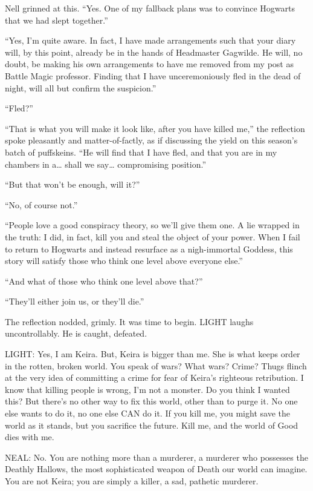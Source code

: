 Nell grinned at this. “Yes. One of my fallback plans was to convince Hogwarts that we had slept together.”

“Yes, I’m quite aware. In fact, I have made arrangements such that your diary will, by this point, already be in the hands of Headmaster Gagwilde. He will, no doubt, be making his own arrangements to have me removed from my post as Battle Magic professor. Finding that I have unceremoniously fled in the dead of night, will all but confirm the suspicion.”

“Fled?”

“That is what you will make it look like, after you have killed me,” the reflection spoke pleasantly and matter-of-factly, as if discussing the yield on this season’s batch of puffskeins. “He will find that I have fled, and that you are in my chambers in a… shall we say… compromising position.”

“But that won’t be enough, will it?”

“No, of course not.”

“People love a good conspiracy theory, so we’ll give them one. A lie wrapped in the truth: I did, in fact, kill you and steal the object of your power. When I fail to return to Hogwarts and instead resurface as a nigh-immortal Goddess, this story will satisfy those who think one level above everyone else.”

“And what of those who think one level above that?”

“They’ll either join us, or they’ll die.”

The reflection nodded, grimly. It was time to begin.
\simpleline
LIGHT laughs uncontrollably. He is caught, defeated.

LIGHT: Yes, I am Keira. But, Keira is bigger than me. She is what keeps order in the rotten, broken world. You speak of wars? What wars? Crime? Thugs flinch at the very idea of committing a crime for fear of Keira’s righteous retribution. I know that killing people is wrong, I’m not a monster. Do you think I wanted this? But there’s no other way to fix this world, other than to purge it. No one else wants to do it, no one else CAN do it. If you kill me, you might save the world as it stands, but you sacrifice the future. Kill me, and the world of Good dies with me.

NEAL: No. You are nothing more than a murderer, a murderer who possesses the Deathly Hallows, the most sophisticated weapon of Death our world can imagine. You are not Keira; you are simply a killer, a sad, pathetic murderer.

